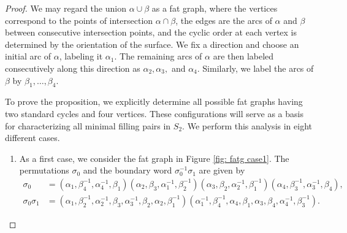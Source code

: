 \documentclass[11pt,reqno]{amsart}
\theoremstyle{plain}
\theoremstyle{definition}
\theoremstyle{remark}
\numberwithin{equation}{section}
\numberwithin{figure}{section}
\begin{document}
\begin{proof}
    We may regard the union $\alpha \cup \beta$ as a fat graph, where the vertices correspond to the points of intersection $\alpha \cap \beta$, the edges are the arcs of $\alpha$ and $\beta$ between consecutive intersection points, and the cyclic order at each vertex is determined by the orientation of the surface. We fix a direction and choose an initial arc of $\alpha$, labeling it $\alpha_1$. The remaining arcs of $\alpha$ are then labeled consecutively along this direction as $\alpha_2, \alpha_3,$ and $\alpha_4$. Similarly, we label the arcs of $\beta$ by $\beta_1, \dots, \beta_4$.

    To prove the proposition, we explicitly determine all possible fat graphs having two standard cycles and four vertices. These configurations will serve as a basis for characterizing all minimal filling pairs in $S_2$. We perform this analysis in eight different cases. 

    
    
    \begin{enumerate}
        \item As a first case, we consider the fat graph in Figure \ref{fig: fatg case1}. The permutations $\sigma_0$ and the boundary word $\sigma_0^{-1}\sigma_1$ are given by 
    \begin{align*}
        \sigma_0 & = (\alpha_1, \beta_4^{-1}, \alpha_4^{-1}, \beta_1) (\alpha_2, \beta_3, \alpha_1^{-1}, \beta_2^{-1}) (\alpha_3, \beta_2, \alpha_2^{-1}, \beta_1^{-1}) (\alpha_4, \beta_3^{-1}, \alpha_3^{-1}, \beta_4),\\
        \sigma_0\sigma_1 & = (\alpha_1, \beta_2^{-1}, \alpha_2^{-1}, \beta_3, \alpha_3^{-1}, \beta_2, \alpha_2, \beta_1^{-1})(\alpha_1^{-1}, \beta_4^{-1}, \alpha_4, \beta_1, \alpha_3, \beta_4, \alpha_4^{-1}, \beta_3^{-1}).
    \end{align*}
    
    \begin{figure}[htbp]
        \centering
\end{figure}
\end{enumerate}
\end{proof}
\end{document}
